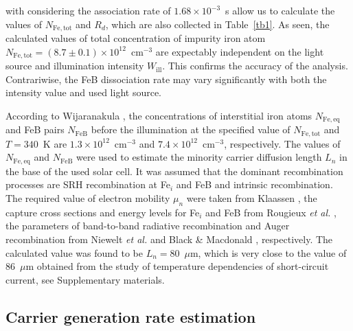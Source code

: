 \documentclass{WileyMSP-template}
\begin{document}
with considering the association rate of $1.68\times10^{-3}$~s allow us
to calculate the values of $N_\mathrm{Fe,tot}$ and $R_d$, which are also collected in Table~\ref{tb1}.
As seen, the calculated values of total concentration of impurity iron atom
$N_\mathrm{Fe,tot}=(8.7\pm0.1)\times10^{12}$~cm$^{-3}$ are expectably independent on the light source and illumination intensity $W_\mathrm{ill}$.
This confirms the accuracy of the analysis.
Contrariwise, the FeB dissociation rate may vary significantly with both the intensity value and used light source.

According to Wijaranakula \cite{FeB:kinetic}, the concentrations of interstitial iron atoms $N_\mathrm{Fe,eq}$ and FeB pairs
$N_\mathrm{FeB}$ before the illumination at the specified value of $N_\mathrm{Fe,tot}$ and $T=340$~K are $1.3\times10^{12}$~cm$^{-3}$ and $7.4\times10^{12}$~cm$^{-3}$, respectively.
The values of $N_\mathrm{Fe,eq}$ and $N_\mathrm{FeB}$ were used to estimate the minority carrier diffusion length $L_n$
in the base of the used solar cell.
It was assumed that the dominant recombination processes are SRH recombination at Fe$_i$ and FeB and intrinsic recombination.
The required value of electron mobility $\mu_n$ were taken from Klaassen \cite{KLAASSEN953},
the capture cross sections and energy levels for Fe$_i$ and FeB from Rougieux \emph{et al.} \cite{ROUGIEUX2018},
the parameters of band-to-band radiative recombination and Auger recombination from
Niewelt \emph{et al.} \cite{Brad2022} and Black \& Macdonald \cite{AugerSi2022}, respectively.
The calculated value was found to be $L_n=80$~$\mu$m,
which is very close to the value of 86~$\mu$m  obtained from the study of temperature dependencies of short-circuit current, see Supplementary materials.


\subsection{Carrier generation rate estimation}\label{SecG}
\end{document}

